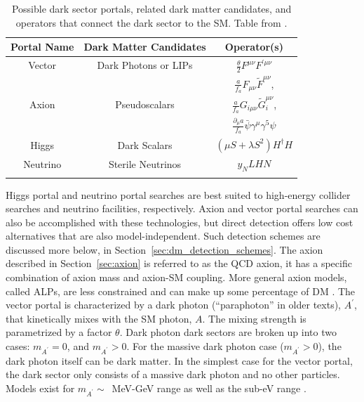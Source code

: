 \begin{table}[htp]
\caption{Possible dark sector portals, related dark matter candidates, and operators that connect the dark sector to the \acs{SM}. Table from \cite{Essig2013}. }
\begin{center}
\begin{tabular}{ c c c }
Portal Name & Dark Matter Candidates &  Operator(s) \\
\hline
Vector & Dark Photons or LIPs & $\frac{\theta}{2} F^{\mu \nu} F^{\prime \mu\nu}$ \\
\multirow{3}{*}{Axion} & \multirow{3}{*}{Pseudoscalars} & $\frac{a}{f_{a}} F_{\mu \nu} \tilde{F}^{\mu \nu}$, \\
& & $\frac{a}{f_{a}} G_{i\mu \nu} \tilde{G}_{i}^{\mu \nu}$,  \\
& & $\frac{\partial_{\mu}a}{f_{a}} \bar{\psi}\gamma^{\mu}\gamma^{5} \psi $ \\
Higgs & Dark Scalars & $(\mu S +\lambda S^{2})H^{\dagger}H $ \\
Neutrino & Sterile Neutrinos & $y_{N}LHN$ \\
\label{tb:portals}
\end{tabular}
\end{center}
\label{default}
\end{table}%

Higgs portal and neutrino portal searches are best suited to high-energy collider searches and neutrino facilities, respectively. Axion and vector portal searches can also be accomplished with these technologies, but direct detection offers low cost alternatives that are also model-independent. Such detection schemes are discussed more below, in Section~\ref{sec:dm_detection_schemes}. The axion described in Section~\ref{sec:axion} is referred to as the QCD axion, it has a specific combination of axion mass and axion-\ac{SM} coupling. More general axion models, called \ac{ALP}s, are less constrained and can make up some percentage of \ac{DM} \cite{Essig2013}. The vector portal is characterized by a dark photon (``paraphoton'' in older texts), $A^{\prime}$, that kinetically mixes with the \ac{SM} photon, $A$. The mixing strength is parametrized by a factor $\theta$. Dark photon dark sectors are broken up into two cases: $m_{A^{\prime}} = 0$, and $m_{A^{\prime}} > 0$. For the massive dark photon case ($m_{A^{\prime}} > 0$), the dark photon itself can be dark matter. In the simplest case for the vector portal, the dark sector only consists of a massive dark photon and no other particles. Models exist for $m_{A^{\prime}} \sim$~MeV-GeV range as well as the sub-eV range \cite{Essig2013}.

